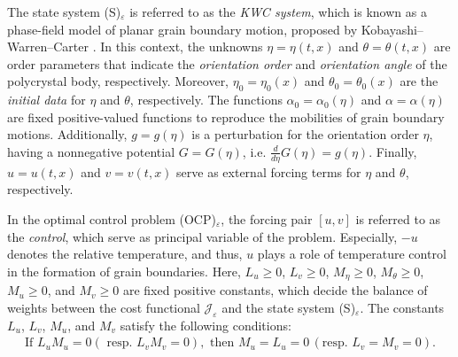 \documentclass{sinst}
\numberwithin{equation}{section}
\theoremstyle{plain}
\theoremstyle{definition}
\def\sJ{\mathscr{J}}
\begin{document}
The state system (S)$_\varepsilon$ is referred to as the \emph{KWC system}, which is known as a phase-field model of planar grain boundary motion, proposed by Kobayashi--Warren--Carter \cite{MR1752970,MR1794359}. 
In this context, the unknowns $ \eta = \eta(t, x) $ and $ \theta = \theta(t, x) $ are order parameters that indicate the \emph{orientation order} and \emph{orientation angle} of the polycrystal body, respectively. Moreover, $ \eta_0 = \eta_0(x) $ and $ \theta_0 = \theta_0(x) $ are the \emph{initial data} for $ \eta $ and $ \theta  $, respectively. The functions $ \alpha_0 = \alpha_0(\eta) $ and $ \alpha = \alpha(\eta) $ are fixed positive-valued functions to reproduce the mobilities of grain boundary motions. Additionally, $ g = g(\eta) $ is a perturbation for the orientation order $ \eta $, having a nonnegative potential $ G = G(\eta) $, i.e. $ \frac{d}{d\eta} G(\eta) = g(\eta) $. 
Finally, $ u = u(t, x) $ and $ v = v(t, x) $ serve as external forcing terms for $ \eta $ and $ \theta  $, respectively. 

In the optimal control problem (OCP)$_\varepsilon$, the forcing pair $ [u, v] $ is referred to as the \emph{control}, which serve as principal variable of the problem. Especially, $ -u $ denotes the relative temperature, and thus, $ u $ plays a role of temperature control in the formation of grain boundaries. Here, $L_u \geq 0$, $L_v \geq 0$, $M_\eta \geq 0$, $M_\theta \geq 0$, $M_u \geq 0$, and $M_v \geq 0$ are fixed positive constants, which decide the balance of weights between the cost functional $\sJ_\varepsilon$ and the state system (S)$_\varepsilon$. The constants $L_u$, $L_v$, $M_u$, and $M_v$ satisfy the following conditions:
\begin{align}
    \mbox{If } L_u M_u = 0 (\mbox{ resp. } L_v M_v = 0), \mbox{ then } M_u = L_u = 0 \, (\mbox{resp. } L_v = M_v = 0).
\end{align}
\end{document}
